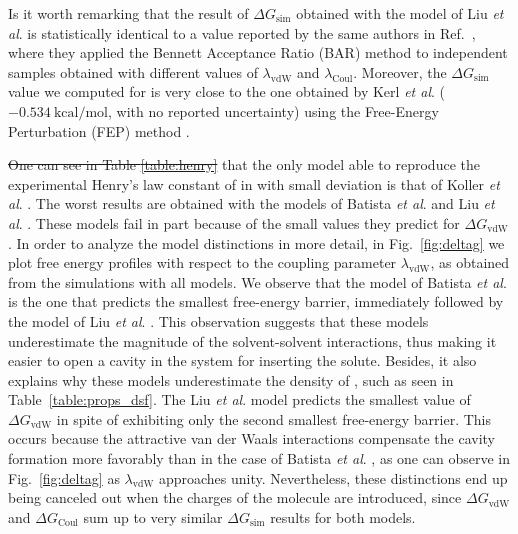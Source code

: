 \documentclass[3p,twocolumn]{elsarticle}
\providecommand{\DIFadd}[1]{{\protect\color{blue}\uwave{#1}}} %
\providecommand{\DIFdel}[1]{{\protect\color{red}\sout{#1}}}                      %
\providecommand{\DIFaddbegin}{} %
\providecommand{\DIFaddend}{} %
\providecommand{\DIFdelbegin}{} %
\providecommand{\DIFdelend}{} %
\newcommand{\DIFscaledelfig}{0.5}
\newlength{\DIFdelgraphicswidth} %
\newlength{\DIFdelgraphicsheight} %
\newcommand{\DIFaddincludegraphics}[2][]{{\color{blue}\fbox{\DIFOincludegraphics[#1]{#2}}}} %
\newcommand{\DIFdelincludegraphics}[2][]{%
\sbox{\DIFdelgraphicsbox}{\DIFOincludegraphics[#1]{#2}}%
\settoboxwidth{\DIFdelgraphicswidth}{\DIFdelgraphicsbox} %
\settoboxtotalheight{\DIFdelgraphicsheight}{\DIFdelgraphicsbox} %
\scalebox{\DIFscaledelfig}{%
\parbox[b]{\DIFdelgraphicswidth}{\usebox{\DIFdelgraphicsbox}\\[-\baselineskip] \rule{\DIFdelgraphicswidth}{0em}}\llap{\resizebox{\DIFdelgraphicswidth}{\DIFdelgraphicsheight}{%
\setlength{\unitlength}{\DIFdelgraphicswidth}%
\begin{picture}(1,1)%
\thicklines\linethickness{2pt} %
{\color[rgb]{1,0,0}\put(0,0){\framebox(1,1){}}}%
{\color[rgb]{1,0,0}\put(0,0){\line( 1,1){1}}}%
{\color[rgb]{1,0,0}\put(0,1){\line(1,-1){1}}}%
\end{picture}%
}\hspace*{3pt}}} %
} %
\DeclareRobustCommand{\DIFaddbegin}{\DIFOaddbegin \let\includegraphics\DIFaddincludegraphics} %
\DeclareRobustCommand{\DIFaddend}{\DIFOaddend \let\includegraphics\DIFOincludegraphics} %
\DeclareRobustCommand{\DIFdelbegin}{\DIFOdelbegin \let\includegraphics\DIFdelincludegraphics} %
\DeclareRobustCommand{\DIFdelend}{\DIFOaddend \let\includegraphics\DIFOincludegraphics} %
\begin{document}
Is it worth remarking that the result of $\Delta G_\text{sim}$ obtained with the model of Liu \textit{et al}. \cite{Liu_2014} is statistically identical to a value reported by the same authors in Ref.~, where they applied the Bennett Acceptance Ratio (BAR) method \cite{Bennett_1976} to independent samples obtained with different values of $\lambda_\text{vdW}$ and $\lambda_\text{Coul}$.
Moreover, the $\Delta G_\text{sim}$ value we computed for \ce{[emim][NTf_2]} is very close to the one obtained by Kerl \textit{et al}. \cite{Kerl__2017} ($-0.534 ~\mathrm{kcal/mol}$, with no reported uncertainty) using the Free-Energy Perturbation (FEP) method \cite{Zwanzig_1954}.

\DIFdelbegin \DIFdel{One can see in Table \ref{table:henry} }\DIFdelend \DIFaddbegin \DIFadd{Table \ref{table:henry} shows }\DIFaddend that the only model able to reproduce the experimental Henry's law constant of  in \ce{[emim][B(CN)_4]} with small deviation is that of Koller \textit{et al}. \cite{Koller_2012}.
The worst results are obtained with the models of Batista \textit{et al}. \cite{Batista_2015} and Liu \textit{et al}. \cite{Liu_2014}.
These models fail in part because of the small values they predict for $\Delta G_\text{vdW}$.
In order to analyze the model distinctions in more detail, in Fig.~\ref{fig:deltag} we plot free energy profiles with respect to the coupling parameter $\lambda_\text{vdW}$, as obtained from the simulations with all \ce{[emim][B(CN)_4]} models.
We observe that the model of Batista \textit{et al}. \cite{Batista_2015} is the one that predicts the smallest free-energy barrier, immediately followed by the model of Liu \textit{et al}. \cite{Liu_2014}.
This observation suggests that these models underestimate the magnitude of the solvent-solvent interactions, thus making it easier to open a cavity in the system for inserting the solute.
Besides, it also explains why these models underestimate the density of \ce{[emim][B(CN)_4]}, such as seen in Table~\ref{table:props_dsf}.
The Liu \textit{et al}. \cite{Liu_2014} model predicts the smallest value of $\Delta G_\text{vdW}$ in spite of exhibiting only the second smallest free-energy barrier.
This occurs because the attractive van der Waals interactions compensate the cavity formation more favorably than in the case of Batista \textit{et al}. \cite{Batista_2015}, as one can observe in Fig.~\ref{fig:deltag} as $\lambda_\text{vdW}$ approaches unity.
Nevertheless, these distinctions end up being canceled out when the charges of the  molecule are introduced, since $\Delta G_\text{vdW}$ and $\Delta G_\text{Coul}$ sum up to very similar $\Delta G_\text{sim}$ results for both models.
\end{document}
